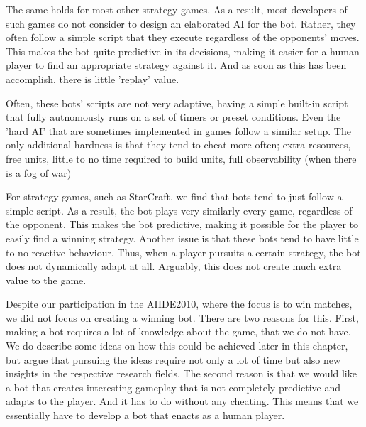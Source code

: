 The same holds for most other strategy games. As a result, most developers of such games do not consider to design an elaborated AI for the bot. Rather, they often follow a simple script that they execute regardless of the opponents' moves. This makes the bot quite predictive in its decisions, making it easier for a human player to find an appropriate strategy against it. And as soon as this has been accomplish, there is little 'replay' value.

Often, these bots' scripts are not very adaptive, having a simple built-in script that fully autnomously runs on a set of timers or preset conditions. Even the 'hard AI' that are sometimes implemented in games follow a similar setup. The only additional hardness is that they tend to cheat more often; extra resources, free units, little to no time required to build units, full observability (when there is a fog of war)




For strategy games, such as StarCraft, we find that bots tend to just follow a simple script. As a result, the bot plays very similarly every game, regardless of the opponent. This makes the bot predictive, making it possible for the player to easily find a winning strategy. Another issue is that these bots tend to have little to no reactive behaviour. Thus, when a player pursuits a certain strategy, the bot does not dynamically adapt at all. Arguably, this does not create much extra value to the game.



Despite our participation in the AIIDE2010, where the focus is to win matches, we did not focus on creating a winning bot. There are two reasons for this. First, making a bot requires a lot of knowledge about the game, that we do not have. We do describe some ideas on how this could be achieved later in this chapter, but argue that pursuing the ideas require not only a lot of time but also new insights in the respective research fields. The second reason is that we would like a bot that creates interesting gameplay that is not completely predictive and adapts to the player. And it has to do without any cheating. This means that we essentially have to develop a bot that enacts as a human player.

